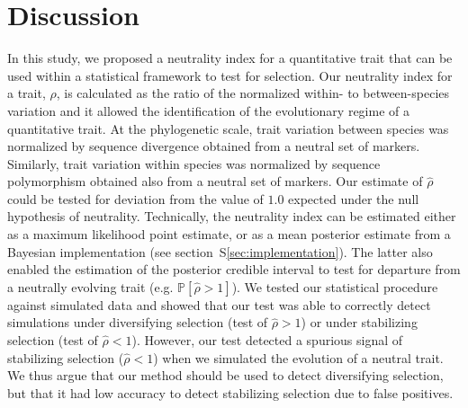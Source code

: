 \documentclass{article}
\newcommand{\proba}{\mathbb{P}}
\newcommand{\NI}{\rho}
\newcommand{\EstNI}{\widehat{\rho}}
\begin{document}
\section{Discussion}\label{sec:discussion}

In this study, we proposed a neutrality index for a quantitative trait that can be used within a statistical framework to test for selection.
Our neutrality index for a trait, $\NI$, is calculated as the ratio of the normalized within- to between-species variation and it allowed the identification of the evolutionary regime of a quantitative trait.
At the phylogenetic scale, trait variation between species was normalized by sequence divergence obtained from a neutral set of markers.
Similarly, trait variation within species was normalized by sequence polymorphism obtained also from a neutral set of markers.
Our estimate of $\EstNI$ could be tested for deviation from the value of $1.0$ expected under the null hypothesis of neutrality.
Technically, the neutrality index can be estimated either as a maximum likelihood point estimate, or as a mean posterior estimate from a Bayesian implementation (see section~S\ref{sec:implementation}).
The latter also enabled the estimation of the posterior credible interval to test for departure from a neutrally evolving trait (e.g. $ \proba [ \EstNI > 1 ]$).
We tested our statistical procedure against simulated data and showed that our test was able to correctly detect simulations under diversifying selection (test of $\EstNI > 1$) or under stabilizing selection (test of $\EstNI < 1$).
However, our test detected a spurious signal of stabilizing selection ($\EstNI < 1$) when we simulated the evolution of a neutral trait.
We thus argue that our method should be used to detect diversifying selection, but that it had low accuracy to detect stabilizing selection due to false positives.
\end{document}
